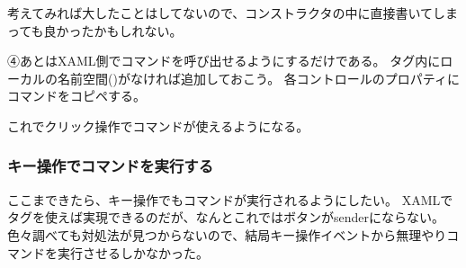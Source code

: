 \documentclass[letterpaper,10pt,dvipdfmx]{sphinxmanual}
\begin{document}
考えてみれば大したことはしてないので、コンストラクタの中に直接書いてしまっても良かったかもしれない。

④あとはXAML側でコマンドを呼び出せるようにするだけである。
タグ内にローカルの名前空間()がなければ追加しておこう。
各コントロールのプロパティにコマンドをコピペする。

\begin{sphinxVerbatim}[commandchars=\\\{\}]
    
                
\end{sphinxVerbatim}

これでクリック操作でコマンドが使えるようになる。


\subsubsection{キー操作でコマンドを実行する}
\label{\detokenize{nissyu-idohen/pc-software-code:}}\label{\detokenize{nissyu-idohen/pc-software-code:id11}}
ここまできたら、キー操作でもコマンドが実行されるようにしたい。
XAMLでタグを使えば実現できるのだが、なんとこれではボタンがsenderにならない。
色々調べても対処法が見つからないので、結局キー操作イベントから無理やりコマンドを実行させるしかなかった。
\end{document}
